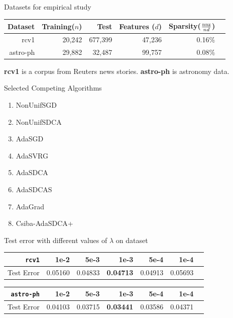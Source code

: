 \begin{frame}{Datasets for empirical study}
\begin{table}[htbp]
    \centering
    \begin{tabular}{|r|r|r|r|r|r}
        \hline
        Dataset & Training($n$) & Test & Features ($d$) & Sparsity($\frac{\operatorname*{nnz}}{nd}$) \\
        \hline
        rcv1      & 20,242 & 677,399 & 47,236 & 0.16\% \\
        \hline
        astro-ph       & 29,882  & 32,487    & 99,757 & 0.08\% \\
        \hline
    \end{tabular}
\end{table}
\begin{block}{}
\textbf{rcv1} is a corpus from Reuters news stories.
\textbf{astro-ph} is astronomy data.
\end{block}
\end{frame}

\begin{frame}{Selected Competing Algorithms}
            \begin{enumerate}
                \item NonUnifSGD
                \item NonUnifSDCA
                \item AdaSGD 
		\item AdaSVRG
                \item AdaSDCA
                \item AdaSDCAS
                \item AdaGrad
                \item Csiba-AdaSDCA+
            \end{enumerate}
\end{frame}

\begin{frame}{Test error with different values of $\lambda$ on dataset }
\begin{table}[htbp]
    \centering
    \begin{tabular}{|r|r|r|r|r|r|r|}
        \hline
        \texttt{rcv1} & 1e-2 & 5e-3 & \textbf{1e-3} & 5e-4 & 1e-4\\
        \hline
        Test Error & 0.05160 & 0.04833 & \textbf{0.04713} & 0.04913 & 0.05693 \\
        \hline
    \end{tabular}
    \begin{tabular}{|r|r|r|r|r|r|r|}
        \hline
         \texttt{astro-ph} & 1e-2 & 5e-3 & \textbf{1e-3} & 5e-4 & 1e-4 \\
        \hline
        Test Error & 0.04103 & 0.03715 & \textbf{0.03441} & 0.03586 & 0.04371 \\
        \hline
    \end{tabular}
\end{table}
\end{frame}

